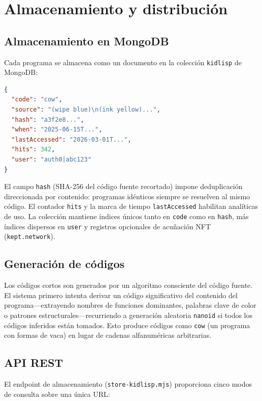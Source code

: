 \documentclass[10pt,letterpaper,twocolumn]{article}
\begin{document}

\section{Almacenamiento y distribución}
\label{sec:infrastructure}

\subsection{Almacenamiento en MongoDB}

Cada programa se almacena como un documento en la colección \texttt{kidlisp} de MongoDB:

\begin{lstlisting}[language=json]
{
  "code": "cow",
  "source": "(wipe blue)\n(ink yellow)...",
  "hash": "a3f2e8...",
  "when": "2025-06-15T...",
  "lastAccessed": "2026-03-01T...",
  "hits": 342,
  "user": "auth0|abc123"
}
\end{lstlisting}

El campo \texttt{hash} (SHA-256 del código fuente recortado) impone deduplicación direccionada por contenido: programas idénticos siempre se resuelven al mismo código. El contador \texttt{hits} y la marca de tiempo \texttt{lastAccessed} habilitan analíticas de uso. La colección mantiene índices únicos tanto en \texttt{code} como en \texttt{hash}, más índices dispersos en \texttt{user} y registros opcionales de acuñación NFT (\texttt{kept.network}).

\subsection{Generación de códigos}

Los códigos cortos son generados por un algoritmo consciente del código fuente. El sistema primero intenta derivar un código significativo del contenido del programa---extrayendo nombres de funciones dominantes, palabras clave de color o patrones estructurales---recurriendo a generación aleatoria \texttt{nanoid} si todos los códigos inferidos están tomados. Esto produce códigos como \texttt{cow} (un programa con formas de vaca) en lugar de cadenas alfanuméricas arbitrarias.

\subsection{API REST}

El endpoint de almacenamiento (\texttt{store-kidlisp.mjs}) proporciona cinco modos de consulta sobre una única URL:
\end{document}
